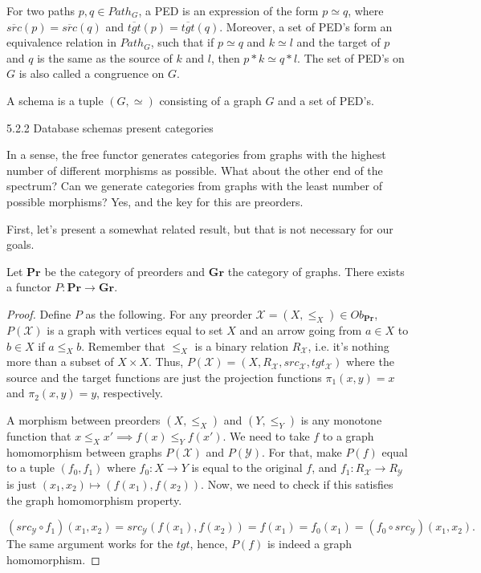 \begin{definition}
  For two paths $p,q \in Path_G$, a PED is an expression of the form
  $p \simeq q$, where $\overline{src}(p) = \overline{src}(q)$ and $\overline {tgt}(p)=\overline {tgt}(q)$.
  Moreover, a set of PED's form an equivalence relation in $Path_G$, such that
  if $p \simeq q$ and $k \simeq l$ and the target of $p$ and $q$ is the same as the source
  of $k$ and $l$, then $p * k \simeq q * l$.
  The set of PED's on $G$ is also called a congruence on $G$.
\end{definition}

\begin{definition}
  A schema is a tuple $(G, \simeq)$ consisting of a graph $G$ and a set of PED's.
\end{definition}

5.2.2
Database schemas present categories


In a  sense, the free
functor generates categories from graphs with the highest number of different morphisms
as possible. What about the other end of the spectrum? Can we generate categories from
graphs with the least number of possible morphisms? Yes, and the key for this are
preorders.

First, let's present a somewhat related result, but that is not necessary for our
goals.

\begin{proposition}
  Let $\mathbf{Pr}$ be the category of preorders and $\mathbf{Gr}$ the category of graphs.
  There exists a functor $P:\mathbf{Pr} \to \mathbf{Gr}$.
\end{proposition}
\begin{proof}
  Define $P$ as the following. For any preorder $\mathcal X=(X,\leq_X) \in Ob_\mathbf{Pr}$,
  $P(\mathcal X)$ is a graph with vertices equal to set $X$ and an arrow going from $a \in X$ to
  $b \in X$ if $a \leq_X b$. Remember that $\leq_X$ is a binary relation $R_\mathcal X$, i.e. it's nothing
  more than a subset of $X\times X$. Thus, $P(\mathcal X) = (X, R_\mathcal X, src_\mathcal X, tgt_\mathcal X)$
  where the source and the target functions are just the projection functions $\pi_1(x,y)= x$ and $\pi_2(x,y)=y$,
  respectively.

  A morphism between preorders $(X,\leq_X)$ and $(Y,\leq_Y)$ is any monotone function
  that $x \leq_X x' \implies f(x) \leq_Y f(x')$.
  We need to take $f$ to a graph
  homomorphism between graphs $P(\mathcal X)$ and $P(\mathcal Y)$. For that,
  make $P(f)$ equal to a tuple $(f_0, f_1)$ where $f_0:X \to Y$ is equal to the
  original $f$, and $f_1:R_\mathcal X \to R_\mathcal Y$ is just $(x_1,x_2)\mapsto (f(x_1), f(x_2))$.
  Now, we need to check if this satisfies the graph homomorphism property.

  \begin{displaymath}
    (src_\mathcal Y \circ f_1)(x_1,x_2) = src_\mathcal Y (f(x_1),f(x_2)) = f(x_1) = f_0 (x_1) =
    (f_0 \circ src_\mathcal Y)(x_1,x_2).
  \end{displaymath}
  The same argument works for the $tgt$, hence, $P(f)$ is indeed a graph homomorphism.
\end{proof}

